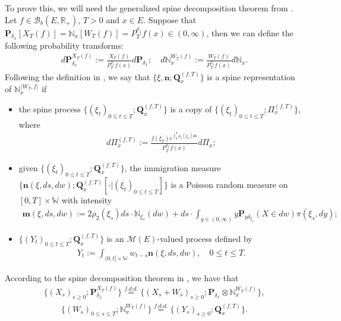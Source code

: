 \documentclass[EJP]{ejpecp} %
\begin{document}
To prove this, we will need the generalized spine decomposition theorem from \cite{RenSongSun2017Spine}.
Let $f\in \mathcal B_b(E,\mathbb R_+)$, $T >0$ and $x\in E$.
Suppose that $\mathbf P_{\delta_x}[X_T(f)] = \mathbb N_x[ W_T(f)] = P^{\rho_1}_T f(x) \in (0,\infty)$, then we can define the following probability transforms:
\begin{align}
  d\mathbf P_{\delta_x}^{ X_T(f)}
  := \frac{X_T(f)}{P_T^{\rho_1} f(x)} d\mathbf P_{\delta_x};
  \quad d\mathbb N_x^{W_T(f)}
  :=  \frac{W_T(f)}{P_T^{\rho_1} f(x)} d\mathbb N_x.
\end{align}
Following the definition in \cite{RenSongSun2017Spine}, we say that $\{\xi, \mathbf n;\mathbf Q_{x}^{(f,T)}\}$ is a spine representation of $\mathbb N_x^{\langle W_T, f\rangle}$ if
\begin{itemize}
\item
  the spine process $\{(\xi_t)_{0\leq t\leq T}; \mathbf Q^{(f,T)}_x\}$ is a copy of $\{(\xi_t)_{0\leq t\leq T}; \Pi^{(f,T)}_{x}\}$, where
  \begin{align}
    d\Pi_x^{(f,T)}
    := \frac{f(\xi_T)e^{\int_0^T \rho_1(\xi_s)ds}}{P^{\rho_1}_T f(x)} d \Pi_x;
  \end{align}
\item
  given $\{(\xi_t)_{0\leq t\leq T}; \mathbf Q^{(f,T)}_x\}$, the immigration measure
$
  \{\mathbf n(\xi,ds,dw); \mathbf Q^{(f,T)}_x[\cdot |(\xi_t)_{0\leq t\leq T}]\}
$
is a Poisson random measure on $[0,T] \times \mathbb W$ with intensity
\begin{align}
  \label{eq: conditional intensity}
  \mathbf m(\xi,ds,dw)
  := 2 \rho_2(\xi_s) ds \cdot \mathbb N_{\xi_s}(dw) + ds \cdot \int_{y\in (0,\infty)} y \mathbf P_{y\delta_{\xi_s}}(X\in dw) \pi(\xi_s,dy);
\end{align}
\item
  $\{(Y_t)_{0\leq t\leq T}; \mathbf Q^{(f,T)}_x\}$ is an $\mathcal M(E)$-valued process defined by
  \begin{align}
    Y_t
    := \int_{(0,t] \times \mathbb W} w_{t-s} \mathbf n(\xi,ds,dw),
    \quad 0 \leq t\leq T.
  \end{align}
\end{itemize}
According to the spine decomposition theorem in \cite{RenSongSun2017Spine}, we have that
\begin{align}
  \label{eq: Spine decomposition 1}
  \{(X_s)_{s \geq 0};\mathbf P_{\delta_x}^{X_T(f)}\}
  \overset{f.d.d.}{=} \{(X_s + W_s)_{s \geq 0};\mathbf P_{\delta_x} \otimes \mathbb N_x^{W_T(f)} \},
\end{align}
\begin{align}
  \label{eq: Spine decomposition 2}
  \{(W_s)_{0\leq s\leq T};\mathbb N_x^{W_T(f)}\}
  \overset{f.d.d.}{=} \{(Y_s)_{s \geq 0};\mathbf Q_x^{(f,T)}\}.
\end{align}
\end{document}
